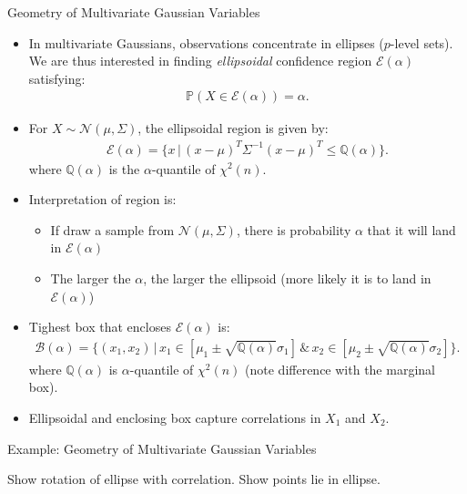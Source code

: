 \documentclass[9pt]{beamer}
\begin{document}
%
\begin{frame}{Geometry of Multivariate Gaussian Variables}

\begin{itemize}
\item  In multivariate Gaussians, observations concentrate in ellipses ($p$-level sets). We are thus interested in finding {\em ellipsoidal} confidence region $\mathcal{E}(\alpha)$ satisfying:
\begin{align*}
\mathbb{P}(X\in \mathcal{E}(\alpha))=\alpha.
\end{align*}
\item For $X\sim \mathcal{N}(\mu,\Sigma)$, the ellipsoidal region is given by:
\begin{align*}
\mathcal{E}(\alpha)=\{x\,|\,(x-\mu)^T\Sigma^{-1}(x-\mu)^T\leq \mathbb{Q}(\alpha)\}.
\end{align*}
where $\mathbb{Q}(\alpha)$ is the $\alpha$-quantile of $\chi^2(n)$.  
\item  Interpretation of region is:
\begin{itemize}
\item If draw a sample from $\mathcal{N}(\mu,\Sigma)$, there is probability $\alpha$ that it will land in $\mathcal{E}(\alpha)$
\item The larger the $\alpha$, the larger the ellipsoid (more likely it is to land in $\mathcal{E}(\alpha)$)
\end{itemize}
\item Tighest box that encloses $\mathcal{E}(\alpha)$ is:
\begin{align*}
\mathcal{B}(\alpha)=\{(x_1,x_2)\,|\,x_1\in [\mu_1\pm \sqrt{\mathbb{Q}(\alpha)}\sigma_1]\,\&\,x_2\in [\mu_2\pm \sqrt{\mathbb{Q}(\alpha)}\sigma_2]\}.
\end{align*}
where $\mathbb{Q}(\alpha)$ is  $\alpha$-quantile of $\chi^2(n)$ (note difference with the marginal box). 
\item Ellipsoidal and enclosing box capture correlations in $X_1$ and $X_2$.
\end{itemize}

\end{frame}

%
\begin{frame}{Example: Geometry of Multivariate Gaussian Variables}

\begin{block}{}
Show rotation of ellipse with correlation. Show points lie in ellipse. 
\end{block}

\end{frame}
\end{document}
